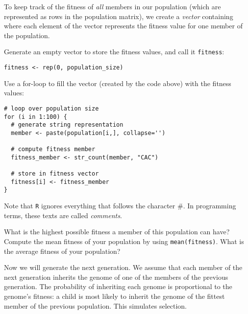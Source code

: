 \documentclass[a4paper, 9pt]{article}
\begin{document}
To keep track of the fitness of \textit{all} members in our population
(which are represented as rows in the population matrix), we create a
\textit{vector} containing where each element of the vector represents
the fitness value for one member of the population.

\begin{exercise}
    \action Generate an empty vector to store the fitness values, and call it \texttt{fitness}:
    \begin{lstlisting}
fitness <- rep(0, population_size)
    \end{lstlisting}
    \action Use a for-loop to fill the vector (created by the code above) with the fitness values:
    \begin{lstlisting}
# loop over population size
for (i in 1:100) {      
  # generate string representation
  member <- paste(population[i,], collapse='') 
  
  # compute fitness member   
  fitness_member <- str_count(member, "CAC")   
  
  # store in fitness vector
  fitness[i] <- fitness_member
}
\end{lstlisting}
    
    Note that \texttt{R} ignores everything that follows the character \#. In programming terms, these texts are called \textit{comments}.
    
    \ask What is the highest possible fitness a member of this population can have?
    \action Compute the mean fitness of your population by using \verb|mean(fitness)|.
    \ask What is the average fitness of your population?
\end{exercise}


Now we will generate the next generation. We assume that each member of
the next generation inherits the genome of one of the members of the
previous generation. The probability of inheriting each genome is
proportional to the genome's fitness: a child is most likely to inherit
the genome of the fittest member of the previous population. This
simulates selection.
\end{document}
